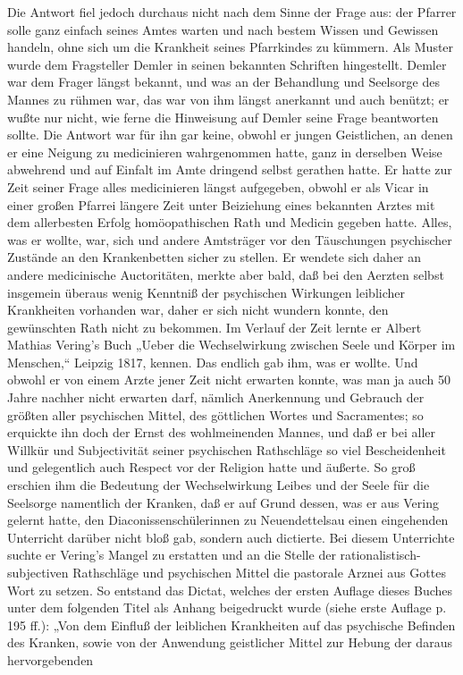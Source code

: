 Die Antwort fiel jedoch durchaus nicht nach dem Sinne der Frage aus: der Pfarrer solle ganz einfach seines Amtes warten und nach bestem Wissen und Gewissen handeln, ohne sich um die Krankheit seines Pfarrkindes zu kümmern. Als Muster wurde dem Fragsteller Demler in seinen bekannten Schriften hingestellt. Demler war dem Frager längst bekannt, und was an der Behandlung und Seelsorge des Mannes zu rühmen war, das war von ihm längst anerkannt und auch benützt; er wußte nur nicht, wie ferne die Hinweisung auf Demler seine Frage beantworten sollte. Die Antwort war für ihn gar keine, obwohl er jungen Geistlichen, an denen er eine Neigung zu medicinieren wahrgenommen hatte, ganz in derselben Weise abwehrend und auf Einfalt im Amte dringend selbst gerathen hatte. Er hatte zur Zeit seiner Frage alles medicinieren längst aufgegeben, obwohl er als Vicar in einer großen Pfarrei längere Zeit unter Beiziehung eines bekannten Arztes mit dem allerbesten Erfolg homöopathischen Rath und Medicin gegeben hatte. Alles, was er wollte, war, sich und andere Amtsträger vor den Täuschungen psychischer Zustände an den Krankenbetten sicher zu stellen. Er wendete sich daher an andere medicinische Auctoritäten, merkte aber bald, daß
bei den Aerzten selbst insgemein überaus wenig Kenntniß der psychischen Wirkungen leiblicher Krankheiten vorhanden war, daher er sich nicht wundern konnte, den gewünschten Rath nicht zu bekommen. Im Verlauf der Zeit lernte er Albert Mathias Vering’s Buch „Ueber die Wechselwirkung zwischen Seele und Körper im Menschen,“ Leipzig 1817, kennen. Das endlich gab ihm, was er wollte. Und obwohl er von einem Arzte jener Zeit nicht erwarten konnte, was man ja auch 50 Jahre nachher nicht erwarten darf, nämlich Anerkennung und Gebrauch der größten aller psychischen Mittel, des göttlichen Wortes und Sacramentes; so erquickte ihn doch der Ernst des wohlmeinenden Mannes, und daß er bei aller Willkür und Subjectivität seiner psychischen Rathschläge so viel Bescheidenheit und gelegentlich auch Respect vor der Religion hatte und äußerte. So groß erschien ihm die Bedeutung der Wechselwirkung Leibes und der Seele für die Seelsorge namentlich der Kranken, daß er auf Grund dessen, was er aus Vering gelernt hatte, den Diaconissenschülerinnen zu Neuendettelsau einen eingehenden Unterricht darüber nicht bloß gab, sondern auch dictierte. Bei diesem Unterrichte suchte er Vering’s Mangel zu erstatten und an die Stelle der rationalistisch-subjectiven Rathschläge und psychischen Mittel die pastorale Arznei aus Gottes Wort zu setzen. So entstand das Dictat, welches der ersten Auflage dieses Buches unter dem folgenden Titel als Anhang beigedruckt wurde (siehe erste Auflage p. 195 ff.): „Von dem Einfluß der leiblichen Krankheiten auf das psychische Befinden des Kranken, sowie von der Anwendung geistlicher Mittel zur Hebung der daraus hervorgebenden
